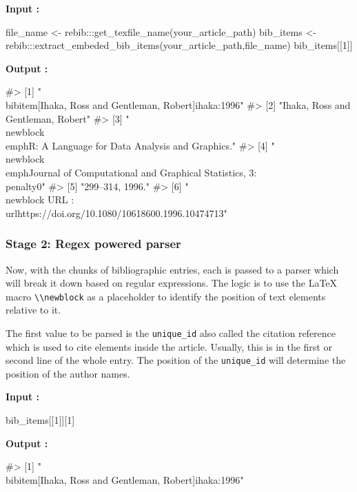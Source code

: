 \begin{Schunk}

\textbf{Input :}
\begin{Sinput}
file_name <- rebib:::get_texfile_name(your_article_path)
bib_items <- rebib:::extract_embeded_bib_items(your_article_path,file_name)
bib_items[[1]]
\end{Sinput}
 
\textbf{Output :}
\begin{Soutput}
#> [1] "\\bibitem[Ihaka, Ross and Gentleman, Robert]{ihaka:1996}"                          
#> [2] "Ihaka, Ross and Gentleman, Robert"                                                 
#> [3] "\\newblock \\emph{R: A Language for Data Analysis and Graphics.}"                  
#> [4] "\\newblock \\emph{Journal of Computational and Graphical Statistics}, 3:\\penalty0"
#> [5] "299--314, 1996."                                                                   
#> [6] "\\newblock URL : \\url{https://doi.org/10.1080/10618600.1996.10474713}"
\end{Soutput}
\end{Schunk}


\subsubsection{Stage 2: Regex powered parser}


Now, with the chunks of bibliographic entries, each is passed to a parser which will break it down based on regular expressions.
The logic is to use the LaTeX macro \verb|\\newblock| as a placeholder to identify the position of text elements relative to it.

The first value to be parsed is the \verb|unique_id| also called the citation reference which is used to cite elements inside the article. Usually, this is in the first or second line of the whole entry. The position of the 
\verb|unique_id| will determine the position of the author names.
\begin{Schunk}
 
\textbf{Input :}
\begin{Sinput}
bib_items[[1]][1]
\end{Sinput}
 
\textbf{Output :}
\begin{Soutput}
#> [1] "\\bibitem[Ihaka, Ross and Gentleman, Robert]{ihaka:1996}"
\end{Soutput}
\end{Schunk}


